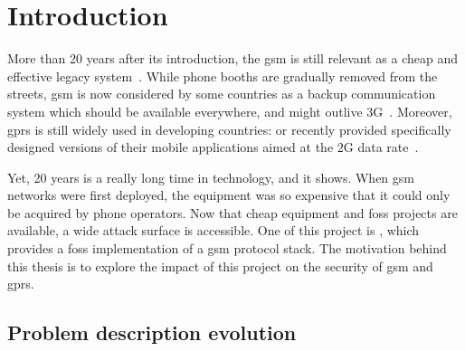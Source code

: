 \chapter{Introduction} \label{chap:introduction}

  

  More than 20 years after its introduction, the \gls{gsm} is still
  relevant as a cheap and effective legacy system~\cite{cox_20_2012}.
  While phone booths are gradually removed from the streets, \gls{gsm}
  is now considered by some countries as a backup communication system
  which should be available everywhere, and might outlive
  3G~\cite{belgium:_2015,morris_frances_2015,carroll_telenor_2015}.
  Moreover, \gls{gprs} is still widely used in developing countries:
   or  recently provided specifically
  designed versions of their mobile applications aimed at the 2G data
  rate~\cite{goldstein_facebook_2015,swami_exclusive:_2015}.

  Yet, 20 years is a really long time in technology, and it shows. When
  \gls{gsm} networks were first deployed, the equipment was so expensive
  that it could only be acquired by phone operators. Now that cheap
  equipment and \gls{foss} projects are available, a wide attack surface
  is accessible. One of this project is , which provides
  a \gls{foss} implementation of a \gls{gsm} protocol stack. The
  motivation behind this thesis is to explore the impact of this project
  on the security of \gls{gsm} and \gls{gprs}. 

  \section{Problem description evolution}
  \label{sec:pb}

